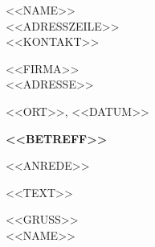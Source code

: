 \documentclass[a4paper,11pt]{article}
\begin{document}
\begin{center}
  {\LARGE <<NAME>>}\\[3pt]
  \small <<ADRESSZEILE>>\\
  <<KONTAKT>>
\end{center}
\vspace{6pt}
<<FIRMA>>\\
<<ADRESSE>>

\hfill <<ORT>>, <<DATUM>>

\textbf{<<BETREFF>>}

<<ANREDE>>

<<TEXT>>

<<GRUSS>>\\[4pt]
<<NAME>>
\end{document}
